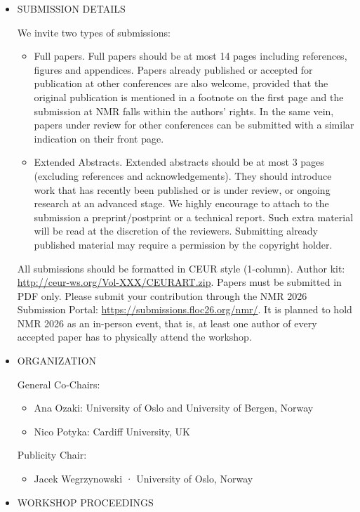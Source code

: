 \documentclass[prodmode,acmtecs]{acmsmall} %
\begin{document}
\begin{itemize}
\item  SUBMISSION DETAILS 
 
  We invite two types of submissions: 
 
\begin{itemize}\item  Full papers. Full papers should be at most 14 pages including references, figures and appendices. Papers already published or accepted for publication at other conferences are also welcome, provided that the original publication is mentioned in a footnote on the first page and the submission at NMR falls within the authors' rights. In the same vein, papers under review for other conferences can be submitted with a similar indication on their front page.
\item  Extended Abstracts. Extended abstracts should be at most 3 pages (excluding references and acknowledgements). They should introduce work that has recently been published or is under review, or ongoing research at an advanced stage. We highly encourage to attach to the submission a preprint/postprint or a technical report. Such extra material will be read at the discretion of the reviewers. Submitting already published material may require a permission by the copyright holder.
\end{itemize} 
  All submissions should be formatted in CEUR style (1-column). Author kit: \href{http://ceur-ws.org/Vol-XXX/CEURART.zip}{http://ceur-ws.org/Vol-XXX/CEURART.zip}. Papers must be submitted in PDF only. Please submit your contribution through the NMR 2026 Submission Portal: \href{https://submissions.floc26.org/nmr/}{https://submissions.floc26.org/nmr/}. It is planned to hold NMR 2026 as an in-person event, that is, at least one author of every accepted paper has to physically attend the workshop. 
 
\item  ORGANIZATION 
 
  General Co-Chairs: 
 
\begin{itemize}\item  Ana Ozaki: University of Oslo and University of Bergen, Norway
\item  Nico Potyka: Cardiff University, UK
\end{itemize} 
  Publicity Chair: 
 
\begin{itemize}\item  Jacek Wegrzynowski · University of Oslo, Norway
\end{itemize} 
\item  WORKSHOP PROCEEDINGS 
 

\end{itemize}
\end{document}
